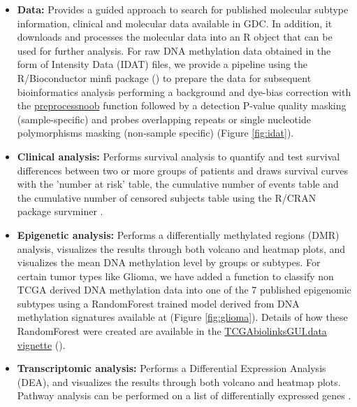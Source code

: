 \begin{itemize}
	\item \textbf{Data:} Provides a guided approach to search for published molecular subtype information, clinical and molecular data available in GDC. In addition, it downloads and processes the molecular data into an R object that can be used for further analysis. For raw DNA methylation data obtained in the form of Intensity Data (IDAT) files, we provide a pipeline using the R/Bioconductor minfi package ()  to prepare the data for subsequent bioinformatics analysis \cite{aryee2014minfi} performing a background and dye-bias correction with the \href{https://www.bioconductor.org/help/course-materials/2015/BioC2015/methylation450k.html\#preprocessnoob}{preprocessnoob} function followed by a detection P-value quality masking (sample-specific) \cite{morris2015analysis} and probes overlapping repeats or single nucleotide polymorphisms masking (non-sample specific) \cite{zhou2016comprehensive} (Figure \ref{fig:idat}).
	\item \textbf{Clinical analysis:} Performs survival analysis to quantify and test survival differences between two or more groups of patients and draws survival curves with the 'number at risk' table, the cumulative number of events table and the cumulative number of censored subjects table using the R/CRAN package survminer \cite{survminer}.
	\item \textbf{Epigenetic analysis:} Performs a differentially methylated regions (DMR) analysis, visualizes the results through both volcano and heatmap plots, and visualizes the mean DNA methylation level by groups or subtypes. For certain tumor types like Glioma, we have added a function to classify non TCGA derived DNA methylation data into one of the 7 published epigenomic subtypes \cite{ceccarelli2016molecular} using a RandomForest trained model derived from DNA methylation signatures available at  (Figure \ref{fig:glioma}). Details of how these RandomForest were created are available in the \href{https://bioconductor.org/packages/devel/data/experiment/vignettes/TCGAbiolinksGUI.data/inst/doc/vignettes.html}{TCGAbiolinksGUI.data vignette} ().
	\item \textbf{Transcriptomic analysis:} Performs a Differential Expression Analysis (DEA), and visualizes the results through both volcano and heatmap plots. Pathway analysis can be performed on a list of differentially expressed genes \cite{luo2013pathview}.

\end{itemize}
